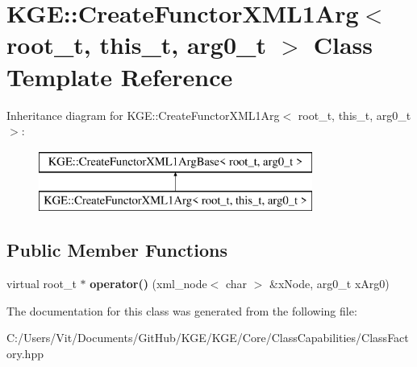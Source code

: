 \hypertarget{class_k_g_e_1_1_create_functor_x_m_l1_arg}{\section{K\-G\-E\-:\-:Create\-Functor\-X\-M\-L1\-Arg$<$ root\-\_\-t, this\-\_\-t, arg0\-\_\-t $>$ Class Template Reference}
\label{class_k_g_e_1_1_create_functor_x_m_l1_arg}
}
Inheritance diagram for K\-G\-E\-:\-:Create\-Functor\-X\-M\-L1\-Arg$<$ root\-\_\-t, this\-\_\-t, arg0\-\_\-t $>$\-:\begin{figure}[H]
\begin{center}
\leavevmode
\includegraphics[height=2.000000cm]{class_k_g_e_1_1_create_functor_x_m_l1_arg}
\end{center}
\end{figure}
\subsection*{Public Member Functions}
\begin{DoxyCompactItemize}
\item 
\hypertarget{class_k_g_e_1_1_create_functor_x_m_l1_arg_a4a13152280271c6516e32138971fe560}{virtual root\-\_\-t $\ast$ {\bfseries operator()} (xml\-\_\-node$<$ char $>$ \&x\-Node, arg0\-\_\-t x\-Arg0)}\label{class_k_g_e_1_1_create_functor_x_m_l1_arg_a4a13152280271c6516e32138971fe560}

\end{DoxyCompactItemize}


The documentation for this class was generated from the following file\-:\begin{DoxyCompactItemize}
\item 
C\-:/\-Users/\-Vit/\-Documents/\-Git\-Hub/\-K\-G\-E/\-K\-G\-E/\-Core/\-Class\-Capabilities/Class\-Factory.\-hpp\end{DoxyCompactItemize}
